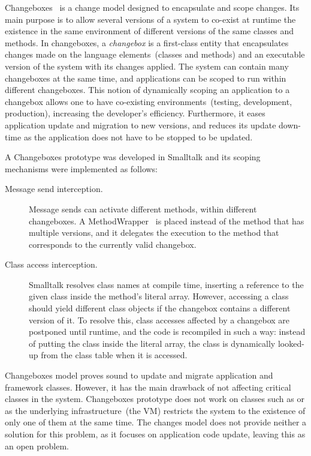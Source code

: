 Changeboxes~\cite{Denk07c} is a change model designed to encapsulate and scope changes. Its main purpose is to allow several versions of a system to co-exist at runtime \ie the existence in the same environment of different versions of the same classes and methods. In changeboxes, a \emph{changebox} is a first-class entity that encapsulates changes made on the language elements~(\eg classes and methods) and an executable version of the system with its changes applied. The system can contain many changeboxes at the same time, and applications can be scoped to run within different changeboxes. This notion of dynamically scoping an application to a changebox allows one to have co-existing environments~(\eg testing, development, production), increasing the developer's efficiency. Furthermore, it eases application update and migration to new versions, and reduces its update down-time as the application does not have to be stopped to be updated.

A Changeboxes prototype was developed in Smalltalk and its scoping mechanisms were implemented as follows:

\begin{description}
\item[Message send interception.] Message sends can activate different methods, within different changeboxes. A MethodWrapper~\cite{Bran98a} is placed instead of the method that has multiple versions, and it delegates the execution to the method that corresponds to the currently valid changebox.

\item[Class access interception.] Smalltalk resolves class names at compile time, inserting a reference to the given class inside the method's literal array. However, accessing a class should yield different class objects if the changebox contains a different version of it. To resolve this, class accesses affected by a changebox are postponed until runtime, and the code is recompiled in such a way: instead of putting the class inside the literal array, the class is dynamically looked-up from the class table when it is accessed.
\end{description}

Changeboxes model proves sound to update and migrate application and framework classes. However, it has the main drawback of not affecting critical classes in the system. Changeboxes prototype does not work on classes such as  or  as the underlying infrastructure~(the VM) restricts the system to the existence of only one of them at the same time. The changes model does not provide neither a solution for this problem, as it focuses on application code update, leaving this as an open problem.

